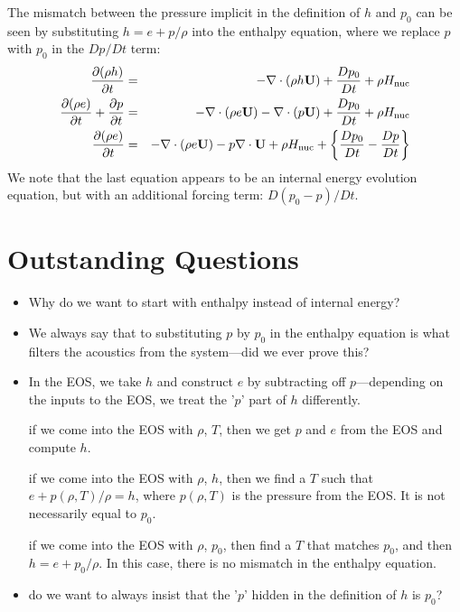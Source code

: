 The mismatch between the pressure implicit in the definition of $h$
and $p_0$ can be seen by substituting $h = e + p/\rho$ into the
enthalpy equation, where we replace $p$ with $p_0$ in the $Dp/Dt$ term:
\begin{eqnarray}
\frac{\partial(\rho h)}{\partial t} &=& -\nabla\cdot(\rho h\Ub) + 
  \frac{Dp_0}{Dt} + \rho\Hnuc \nonumber \\
%
\frac{\partial(\rho e)}{\partial t} + \frac{\partial p}{\partial t} &=&
 -\nabla\cdot(\rho e\Ub) -\nabla\cdot(p\Ub) + \frac{Dp_0}{Dt} + \rho\Hnuc \nonumber \\
%
\frac{\partial(\rho e)}{\partial t} &=&
 -\nabla\cdot(\rho e\Ub) - p\nabla\cdot\Ub + \rho\Hnuc + 
  \left \{ \frac{Dp_0}{Dt} - \frac{Dp}{Dt} \right \} \nonumber 
\end{eqnarray}
We note that the last equation appears to be an internal energy
evolution equation, but with an additional forcing term: $D(p_0 - p)/Dt$.

\section{Outstanding Questions}

\begin{itemize}
\item Why do we want to start with enthalpy instead of internal energy?


\item We always say that to substituting $p$ by $p_0$ in the enthalpy equation
   is what filters the acoustics from the system---did we ever prove this?


\item In the EOS, we take $h$ and construct $e$ by subtracting off
  $p$---depending on the inputs to the EOS, we treat the '$p$' part of $h$
  differently.

   if we come into the EOS with $\rho$, $T$, then we get $p$ and $e$ from
   the EOS and compute $h$.

   if we come into the EOS with $\rho$, $h$, then we find a $T$ such that
   $e + p(\rho,T)/\rho = h$, where $p(\rho,T)$ is the pressure from the EOS.
   It is not necessarily equal to $p_0$.

   if we come into the EOS with $\rho$, $p_0$, then find a $T$ that matches
   $p_0$, and then $h = e + p_0/\rho$.  In this case, there is no mismatch
   in the enthalpy equation.


\item do we want to always insist that the '$p$' hidden in the definition of
   $h$ is $p_0$?

\end{itemize}






